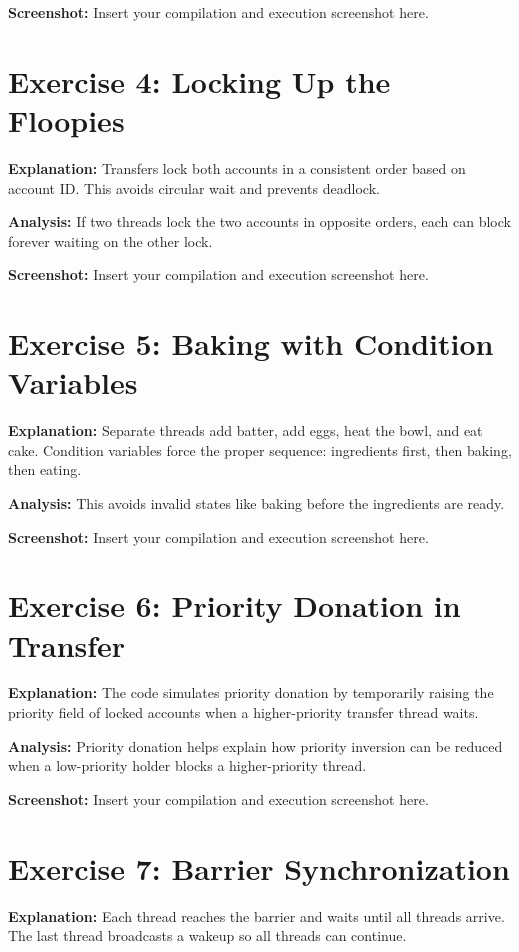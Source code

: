 \documentclass{article}
\begin{document}
\textbf{Screenshot:} Insert your compilation and execution screenshot here.

\section{Exercise 4: Locking Up the Floopies}

\textbf{Explanation:} Transfers lock both accounts in a consistent order based on account ID. This avoids circular wait and prevents deadlock.

\textbf{Analysis:} If two threads lock the two accounts in opposite orders, each can block forever waiting on the other lock.

\textbf{Screenshot:} Insert your compilation and execution screenshot here.

\section{Exercise 5: Baking with Condition Variables}

\textbf{Explanation:} Separate threads add batter, add eggs, heat the bowl, and eat cake. Condition variables force the proper sequence: ingredients first, then baking, then eating.

\textbf{Analysis:} This avoids invalid states like baking before the ingredients are ready.

\textbf{Screenshot:} Insert your compilation and execution screenshot here.

\section{Exercise 6: Priority Donation in Transfer}

\textbf{Explanation:} The code simulates priority donation by temporarily raising the priority field of locked accounts when a higher-priority transfer thread waits.

\textbf{Analysis:} Priority donation helps explain how priority inversion can be reduced when a low-priority holder blocks a higher-priority thread.

\textbf{Screenshot:} Insert your compilation and execution screenshot here.

\section{Exercise 7: Barrier Synchronization}

\textbf{Explanation:} Each thread reaches the barrier and waits until all threads arrive. The last thread broadcasts a wakeup so all threads can continue.
\end{document}
